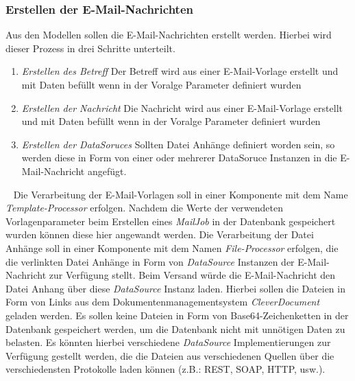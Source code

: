 \subsubsection{Erstellen der E-Mail-Nachrichten}
Aus den Modellen sollen die E-Mail-Nachrichten erstellt werden. Hierbei wird dieser Prozess in drei Schritte unterteilt.
\begin{enumerate}
	\item\emph{Erstellen des Betreff}
	\newline
	Der Betreff wird aus einer E-Mail-Vorlage erstellt und mit Daten befüllt wenn in der Voralge Parameter definiert wurden
	\item\emph{Erstellen der Nachricht}
	\newline
	Die Nachricht wird aus einer E-Mail-Vorlage erstellt und mit Daten befüllt wenn in der Voralge Parameter definiert wurden
	\item\emph{Erstellen der DataSoruces}
	\newline
	Sollten Datei Anhänge definiert worden sein, so werden diese in Form von einer oder mehrerer DataSoruce Instanzen in die E-Mail-Nachricht angefügt.
\end{enumerate}
\ \newline
Die Verarbeitung der E-Mail-Vorlagen soll in einer Komponente mit dem Name \emph{Template-Processor} erfolgen. Nachdem die Werte der verwendeten Vorlagenparameter beim Erstellen eines \emph{MailJob} in der Datenbank gespeichert wurden können diese hier angewandt werden.
\newline
\newline
Die Verarbeitung der Datei Anhänge soll in einer Komponente mit dem Namen \emph{File-Processor} erfolgen, die die verlinkten Datei Anhänge in Form von \emph{DataSource} Instanzen der E-Mail-Nachricht zur Verfügung stellt. Beim Versand würde die E-Mail-Nachricht den Datei Anhang über diese \emph{DataSource} Instanz laden. Hierbei sollen die Dateien in Form von Links aus dem Dokumentenmanagementsystem \emph{CleverDocument} geladen werden. Es sollen keine Dateien in Form von Base64-Zeichenketten in der Datenbank gespeichert werden, um die Datenbank nicht mit unnötigen Daten zu belasten. Es könnten hierbei verschiedene \emph{DataSource} Implementierungen zur Verfügung gestellt werden, die die Dateien aus verschiedenen Quellen über die verschiedensten Protokolle laden können (z.B.: REST, SOAP, HTTP, usw.).

